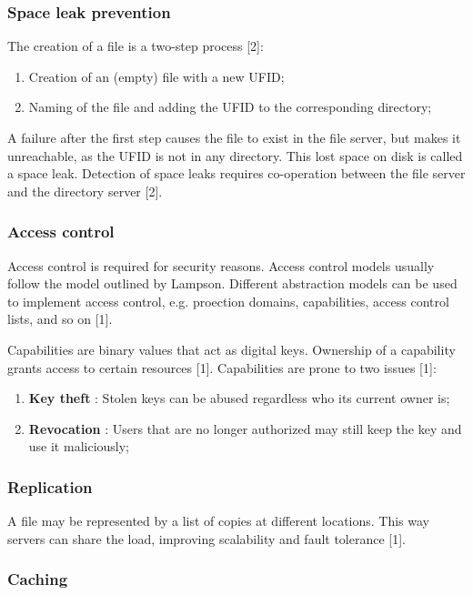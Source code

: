 \subsubsection{Space leak prevention}

The creation of a file is a two-step process [2]:
\begin{enumerate}
	\item Creation of an (empty) file with a new UFID;
	\item Naming of the file and adding the UFID to the corresponding directory;
\end{enumerate}

A failure after the first step causes the file to exist in the file server, but makes it unreachable, as the UFID is not in any directory. This lost space on disk is called a space leak. Detection of space leaks requires co-operation between the file server and the directory server [2].


\subsubsection{Access control}

Access control is required for security reasons. Access control models usually follow the model outlined by Lampson. Different abstraction models can be used to implement access control, e.g. proection domains, capabilities, access control lists, and so on [1].

Capabilities are binary values that act as digital keys. Ownership of a capability grants access to certain resources [1]. Capabilities are prone to two issues [1]:
\begin{enumerate}
	\item \textbf{Key theft} : Stolen keys can be abused regardless who its current owner is;
	\item \textbf{Revocation} : Users that are no longer authorized may still keep the key and use it maliciously;
\end{enumerate}


\subsubsection{Replication}

A file may be represented by a list of copies at different locations. This way servers can share the load, improving scalability and fault tolerance [1].


\subsubsection{Caching}

